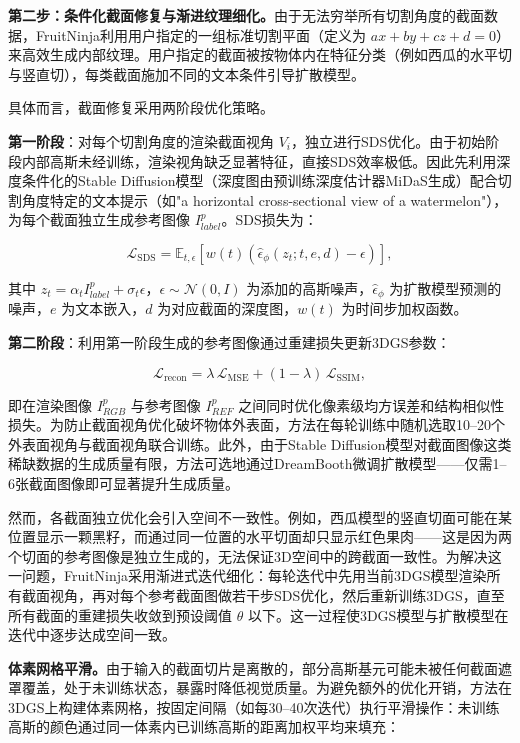 \textbf{第二步：条件化截面修复与渐进纹理细化。}由于无法穷举所有切割角度的截面数据，FruitNinja利用用户指定的一组标准切割平面（定义为 $ax + by + cz + d = 0$）来高效生成内部纹理。用户指定的截面被按物体内在特征分类（例如西瓜的水平切与竖直切），每类截面施加不同的文本条件引导扩散模型。

具体而言，截面修复采用两阶段优化策略。

\textbf{第一阶段}：对每个切割角度的渲染截面视角 $V_i$，独立进行SDS优化。由于初始阶段内部高斯未经训练，渲染视角缺乏显著特征，直接SDS效率极低。因此先利用深度条件化的Stable Diffusion模型（深度图由预训练深度估计器MiDaS生成）配合切割角度特定的文本提示（如"a horizontal cross-sectional view of a watermelon"），为每个截面独立生成参考图像 $I_{label}^p$。SDS损失为：

\begin{equation}
\mathcal{L}_{\mathrm{SDS}} = \mathbb{E}_{t,\epsilon}\left[w(t)\left(\hat{\epsilon}_\phi(z_t; t, e, d) - \epsilon\right)\right],
\end{equation}

其中 $z_t = \alpha_t I_{label}^p + \sigma_t \epsilon$，$\epsilon \sim \mathcal{N}(0,I)$ 为添加的高斯噪声，$\hat{\epsilon}_\phi$ 为扩散模型预测的噪声，$e$ 为文本嵌入，$d$ 为对应截面的深度图，$w(t)$ 为时间步加权函数。

\textbf{第二阶段}：利用第一阶段生成的参考图像通过重建损失更新3DGS参数：

\begin{equation}
\mathcal{L}_{\mathrm{recon}} = \lambda\,\mathcal{L}_{\mathrm{MSE}} + (1-\lambda)\,\mathcal{L}_{\mathrm{SSIM}},
\end{equation}

即在渲染图像 $I_{RGB}^p$ 与参考图像 $I_{REF}^p$ 之间同时优化像素级均方误差和结构相似性损失。为防止截面视角优化破坏物体外表面，方法在每轮训练中随机选取10--20个外表面视角与截面视角联合训练。此外，由于Stable Diffusion模型对截面图像这类稀缺数据的生成质量有限，方法可选地通过DreamBooth微调扩散模型——仅需1--6张截面图像即可显著提升生成质量。

然而，各截面独立优化会引入空间不一致性。例如，西瓜模型的竖直切面可能在某位置显示一颗黑籽，而通过同一位置的水平切面却只显示红色果肉——这是因为两个切面的参考图像是独立生成的，无法保证3D空间中的跨截面一致性。为解决这一问题，FruitNinja采用渐进式迭代细化：每轮迭代中先用当前3DGS模型渲染所有截面视角，再对每个参考截面图做若干步SDS优化，然后重新训练3DGS，直至所有截面的重建损失收敛到预设阈值 $\theta$ 以下。这一过程使3DGS模型与扩散模型在迭代中逐步达成空间一致。

\textbf{体素网格平滑。}由于输入的截面切片是离散的，部分高斯基元可能未被任何截面遮罩覆盖，处于未训练状态，暴露时降低视觉质量。为避免额外的优化开销，方法在3DGS上构建体素网格，按固定间隔（如每30--40次迭代）执行平滑操作：未训练高斯的颜色通过同一体素内已训练高斯的距离加权平均来填充：

